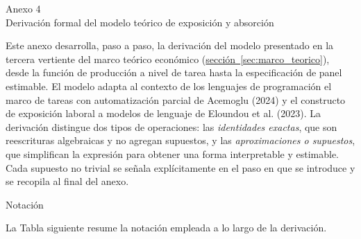 \documentclass[12pt,a4paper]{article}
\let\textbf\textmd
\begin{document}
\clearpage
{}
\label{anexo:4}
{\noindent Anexo 4}\\[4pt]
{\noindent Derivación formal del modelo teórico de exposición y absorción}

\noindent Este anexo desarrolla, paso a paso, la derivación del modelo presentado en la tercera vertiente del marco teórico económico (\hyperref[sec:marco_teorico]{sección~\ref*{sec:marco_teorico}}), desde la función de producción a nivel de tarea hasta la especificación de panel estimable. El modelo adapta al contexto de los lenguajes de programación el marco de tareas con automatización parcial de Acemoglu (2024) y el constructo de exposición laboral a modelos de lenguaje de Eloundou et al. (2023). La derivación distingue dos tipos de operaciones: las \textit{identidades exactas}, que son reescrituras algebraicas y no agregan supuestos, y las \textit{aproximaciones o supuestos}, que simplifican la expresión para obtener una forma interpretable y estimable. Cada supuesto no trivial se señala explícitamente en el paso en que se introduce y se recopila al final del anexo.

\bigskip
\noindent\textbf{Notación}

\medskip
\noindent La Tabla siguiente resume la notación empleada a lo largo de la derivación.
\end{document}

